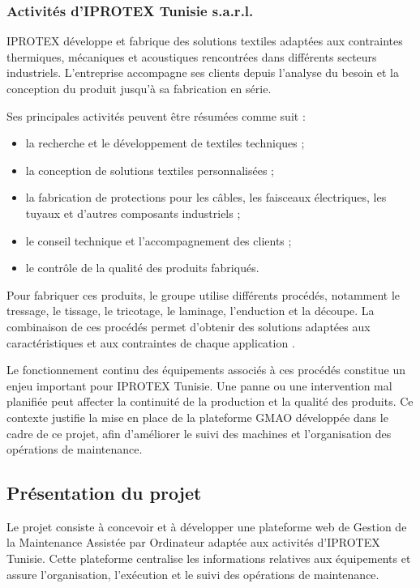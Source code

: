 \subsubsection{Activités d’IPROTEX Tunisie s.a.r.l.}

IPROTEX développe et fabrique des solutions textiles adaptées aux contraintes thermiques, mécaniques et acoustiques rencontrées dans différents secteurs industriels. L’entreprise accompagne ses clients depuis l’analyse du besoin et la conception du produit jusqu’à sa fabrication en série.

Ses principales activités peuvent être résumées comme suit :

\begin{itemize}
    \item la recherche et le développement de textiles techniques ;
    \item la conception de solutions textiles personnalisées ;
    \item la fabrication de protections pour les câbles, les faisceaux électriques, les tuyaux et d’autres composants industriels ;
    \item le conseil technique et l’accompagnement des clients ;
    \item le contrôle de la qualité des produits fabriqués.
\end{itemize}

Pour fabriquer ces produits, le groupe utilise différents procédés, notamment le tressage, le tissage, le tricotage, le laminage, l’enduction et la découpe. La combinaison de ces procédés permet d’obtenir des solutions adaptées aux caractéristiques et aux contraintes de chaque application \cite{iprotex_tailormade}.

Le fonctionnement continu des équipements associés à ces procédés constitue un enjeu important pour IPROTEX Tunisie. Une panne ou une intervention mal planifiée peut affecter la continuité de la production et la qualité des produits. Ce contexte justifie la mise en place de la plateforme GMAO développée dans le cadre de ce projet, afin d’améliorer le suivi des machines et l’organisation des opérations de maintenance.


\subsection{Présentation du projet}

Le projet consiste à concevoir et à développer une plateforme web de Gestion de la Maintenance Assistée par Ordinateur adaptée aux activités d’IPROTEX Tunisie. Cette plateforme centralise les informations relatives aux équipements et assure l’organisation, l’exécution et le suivi des opérations de maintenance.

